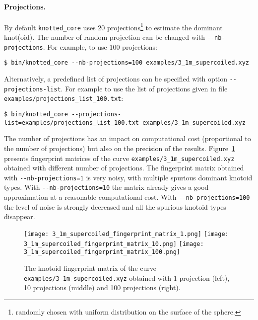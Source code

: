 \paragraph{Projections.}
By default \lstinline{knotted_core} uses 20 projections\footnote{randomly chosen with uniform distribution on the surface of the sphere.} to estimate the dominant knot(oid). The number of random projection can be changed with \lstinline{--nb-projections}. For example, to use 100 projections:
\begin{lstlisting}
$ bin/knotted_core --nb-projections=100 examples/3_1m_supercoiled.xyz
\end{lstlisting}
Alternatively, a predefined list of projections can be specified with option \lstinline{--projections-list}. For example to use the list of projections given in file \lstinline{examples/projections_list_100.txt}:
\begin{lstlisting}
$ bin/knotted_core --projections-list=examples/projections_list_100.txt examples/3_1m_supercoiled.xyz
\end{lstlisting}

The number of projections has an impact on computational cost (proportional to the number of projections) but also on the precision of the results. 
Figure~\ref{fig:3_1m_supercoiled:fingerprint:nprojections} presents fingerprint matrices of the curve \lstinline{examples/3_1m_supercoiled.xyz} obtained with different number of projections. The fingerprint matrix obtained with \lstinline{--nb-projections=1} is very noisy, with multiple spurious dominant knotoid types. With \lstinline{--nb-projections=10} the matrix already gives a good approximation at a reasonable computational cost. With \lstinline{--nb-projections=100} the level of noise is strongly decreased and all the spurious knotoid types disappear.
\begin{figure}[t]
\centering
\texttt{[image: 3\_1m\_supercoiled\_fingerprint\_matrix\_1.png]}
\texttt{[image: 3\_1m\_supercoiled\_fingerprint\_matrix\_10.png]}
\texttt{[image: 3\_1m\_supercoiled\_fingerprint\_matrix\_100.png]}
\caption{ The knotoid fingerprint matrix of the curve \lstinline{examples/3_1m_supercoiled.xyz} obtained with 1 projection (left), 10 projections (middle) and 100 projections (right).}\label{fig:3_1m_supercoiled:fingerprint:nprojections}
\end{figure}




